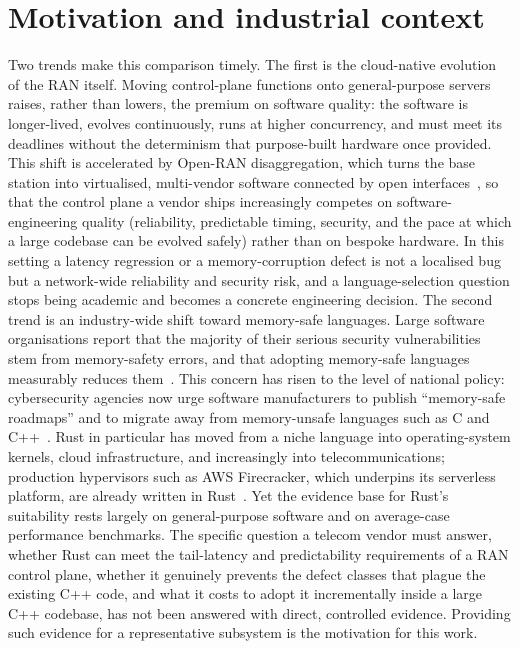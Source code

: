 \documentclass[english,twoside,openright,a4paper,censored,csm,software-track-2020]{HYthesisML}
\begin{document}
\section{Motivation and industrial context}
Two trends make this comparison timely. The first is the cloud-native evolution of the RAN
itself. Moving control-plane functions onto general-purpose servers raises, rather than
lowers, the premium on software quality: the software is longer-lived, evolves continuously,
runs at higher concurrency, and must meet its deadlines without the determinism that
purpose-built hardware once provided. This shift is accelerated by Open-RAN disaggregation,
which turns the base station into virtualised, multi-vendor software connected by open
interfaces~\cite{polese2023oran}, so that the control plane a vendor ships increasingly
competes on software-engineering quality (reliability, predictable timing, security, and the
pace at which a large codebase can be evolved safely) rather than on bespoke hardware. In
this setting a latency regression or a memory-corruption defect is not a localised bug but a
network-wide reliability and security risk, and a language-selection question stops being
academic and becomes a concrete engineering decision.
The second trend is an industry-wide shift toward memory-safe languages. Large
software organisations report that the majority of their serious security vulnerabilities
stem from memory-safety errors, and that adopting memory-safe languages measurably reduces
them~\cite{msrc2019memory,google2022android,google2024securebydesign}. This concern has risen to the level of national
policy: cybersecurity agencies now urge software manufacturers to publish ``memory-safe
roadmaps'' and to migrate away from memory-unsafe languages such as C and
C++~\cite{cisa2023memorysafe,oncd2024building}. Rust in particular has moved from a niche
language into operating-system kernels, cloud infrastructure, and increasingly into
telecommunications; production hypervisors such as AWS Firecracker, which underpins its
serverless platform, are already written in Rust~\cite{agache2020firecracker}. Yet the evidence base for Rust's suitability rests largely on
general-purpose software and on average-case performance benchmarks. The specific question a
telecom vendor must answer, whether Rust can meet the tail-latency and predictability
requirements of a RAN control plane, whether it genuinely prevents the defect classes that
plague the existing C++ code, and what it costs to adopt it incrementally inside a large C++
codebase, has not been answered with direct, controlled evidence. Providing such evidence
for a representative subsystem is the motivation for this work.
\end{document}
